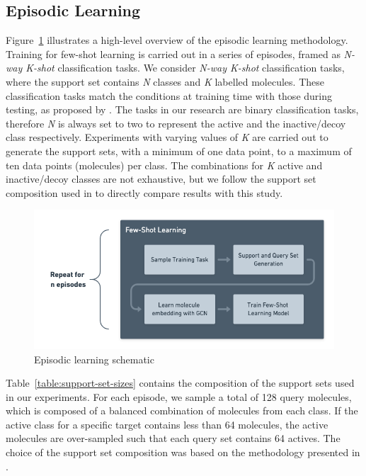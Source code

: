 \subsection{Episodic Learning}

Figure~\ref{fig:episodiclearning} illustrates a high-level overview of the episodic learning methodology. Training for few-shot learning is carried out in a series of episodes, framed as \textit{N-way K-shot} classification tasks. We consider \textit{N-way K-shot} classification tasks, where the support set contains \textit{N} classes and \textit{K} labelled molecules. These classification tasks match the conditions at training time with those during testing, as proposed by \citet{vinyals2016matching}. The tasks in our research are binary classification tasks, therefore \textit{N} is always set to two to represent the active and the inactive/decoy class respectively. Experiments with varying values of \textit{K} are carried out to generate the support sets, with a minimum of one data point, to a maximum of ten data points (molecules) per class. The combinations for \textit{K} active and inactive/decoy classes are not exhaustive, but we follow the support set composition used in \citet{altae2017low} to directly compare results with this study.

\begin{figure}[ht!]
	\centering
	\includegraphics[width=0.9\linewidth]{img/episodic-learning.png}
	\caption{Episodic learning schematic}
	\label{fig:episodiclearning}
\end{figure}

Table~\ref{table:support-set-sizes} contains the composition of the support sets used in our experiments. For each episode, we sample a total of 128 query molecules, which is composed of a balanced combination of molecules from each class. If the active class for a specific target contains less than 64 molecules, the active molecules are over-sampled such that each query set contains 64 actives. The choice of the support set composition was based on the methodology presented in \citet{altae2017low}.

